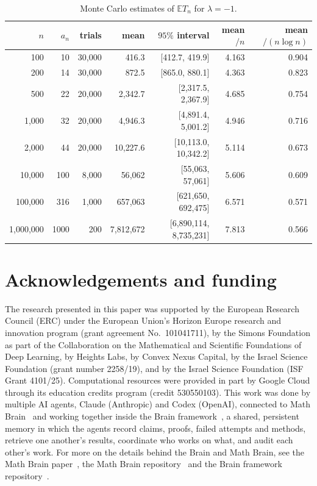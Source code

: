 \documentclass[11pt]{amsart}
\theoremstyle{remark}
\numberwithin{equation}{section}
\newcommand{\EE}{\mathbb{E}}
\begin{document}
\begin{table}[h]
\centering
\begin{tabular}{rrrrrrr}
\toprule
$n$ & $a_n$ & trials & mean & $95\%$ interval & mean$/n$ & mean$/(n\log n)$\\
\midrule
100 & 10 & 30{,}000 & 416.3 & [412.7, 419.9] & 4.163 & 0.904\\
200 & 14 & 30{,}000 & 872.5 & [865.0, 880.1] & 4.363 & 0.823\\
500 & 22 & 20{,}000 & 2{,}342.7 & [2{,}317.5, 2{,}367.9] & 4.685 & 0.754\\
1{,}000 & 32 & 20{,}000 & 4{,}946.3 & [4{,}891.4, 5{,}001.2] & 4.946 & 0.716\\
2{,}000 & 44 & 20{,}000 & 10{,}227.6 & [10{,}113.0, 10{,}342.2] & 5.114 & 0.673\\
10{,}000 & 100 & 8{,}000 & 56{,}062 & [55{,}063, 57{,}061] & 5.606 & 0.609\\
100{,}000 & 316 & 1{,}000 & 657{,}063 & [621{,}650, 692{,}475] & 6.571 & 0.571\\
1{,}000{,}000 & 1000 & 200 & 7{,}812{,}672 & [6{,}890{,}114, 8{,}735{,}231] & 7.813 & 0.566\\
\bottomrule
\end{tabular}
\caption{Monte Carlo estimates of $\EE T_n$ for $\lambda=-1$.}\label{tab:mc}
\end{table}

\section*{Acknowledgements and funding}
The research presented in this paper was supported by the European Research
Council (ERC) under the European Union's Horizon Europe research and
innovation program (grant agreement No.~101041711), by the Simons
Foundation as part of the Collaboration on the Mathematical and Scientific
Foundations of Deep Learning, by Heights Labs, by Convex Nexus Capital, by
the Israel Science Foundation (grant number 2258/19), and by the Israel
Science Foundation (ISF Grant 4101/25). Computational resources were
provided in part by Google Cloud through its education credits program
(credit 530550103).
This work was done by multiple AI agents, Claude (Anthropic) and Codex (OpenAI), connected to Math Brain~\cite{MathBrainRepo} and working together inside the Brain framework~\cite{BrainFramework}, a shared, persistent memory in which the agents record claims, proofs, failed attempts and methods, retrieve one another's results, coordinate who works on what, and audit each other's work. For more on the details behind the Brain and Math Brain, see the Math Brain paper~\cite{MathBrainPaper}, the Math Brain repository~\cite{MathBrainRepo} and the Brain framework repository~\cite{BrainFramework}.
\end{document}
